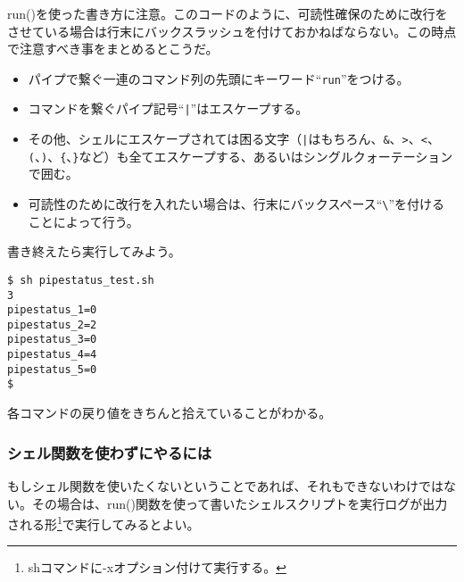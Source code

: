 run()を使った書き方に注意。このコードのように、可読性確保のために改行をさせている場合は行末にバックスラッシュを付けておかねばならない。この時点で注意すべき事をまとめるとこうだ。
\begin{itemize}
  \item パイプで繋ぐ一連のコマンド列の先頭にキーワード``\verb|run|''をつける。
  \item コマンドを繋ぐパイプ記号``\verb!|!''はエスケープする。
  \item その他、シェルにエスケープされては困る文字（\verb!|!はもちろん、\verb!&!、\verb!>!、\verb!<!、\verb!(!、\verb!)!、\verb!{!、\verb!}!など）も全てエスケープする、あるいはシングルクォーテーションで囲む。
  \item 可読性のために改行を入れたい場合は、行末にバックスペース``\verb|\|''を付けることによって行う。
\end{itemize}

書き終えたら実行してみよう。

\begin{screen}
	\verb|$ sh pipestatus_test.sh| \return \\
	\verb|3| \\
	\verb|pipestatus_1=0| \\
	\verb|pipestatus_2=2| \\
	\verb|pipestatus_3=0| \\
	\verb|pipestatus_4=4| \\
	\verb|pipestatus_5=0| \\
	\verb|$ |
\end{screen}

各コマンドの戻り値をきちんと拾えていることがわかる。

\subsubsection*{シェル関数を使わずにやるには}

もしシェル関数を使いたくないということであれば、それもできないわけではない。その場合は、run()関数を使って書いたシェルスクリプトを実行ログが出力される形\footnote{shコマンドに-xオプション付けて実行する。}で実行してみるとよい。

